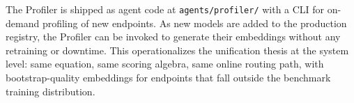 The Profiler is shipped as agent code at \texttt{agents/profiler/} with a CLI for on-demand profiling of new endpoints. As new models are added to the production registry, the Profiler can be invoked to generate their embeddings without any retraining or downtime. This operationalizes the unification thesis at the system level: same equation, same scoring algebra, same online routing path, with bootstrap-quality embeddings for endpoints that fall outside the benchmark training distribution.
